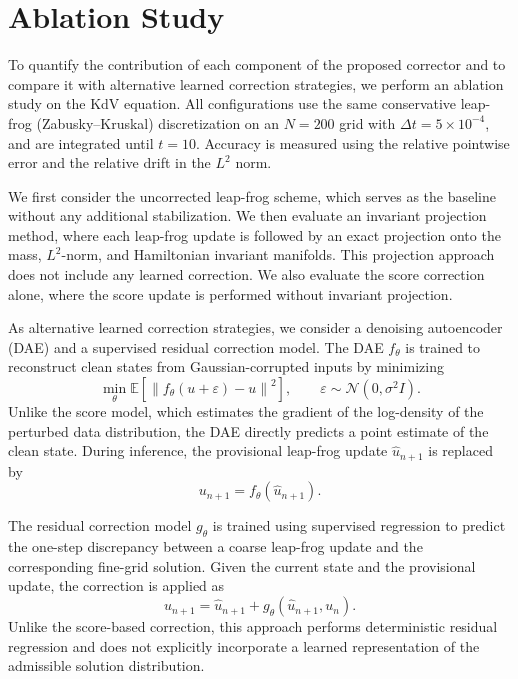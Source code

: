 \documentclass[letterpaper]{article} %
\begin{document}

\section{Ablation Study}
\label{app:ablation}

To quantify the contribution of each component of the proposed corrector and
to compare it with alternative learned correction strategies, we perform an
ablation study on the KdV equation. All configurations use the same
conservative leap-frog (Zabusky--Kruskal) discretization on an $N=200$ grid
with $\Delta t=5\times10^{-4}$, and are integrated until $t=10$. Accuracy is
measured using the relative pointwise error and the relative drift in the $L^2$ norm.

We first consider the uncorrected leap-frog scheme, which serves as the
baseline without any additional stabilization. We then evaluate an invariant
projection method, where each leap-frog update is followed by an exact
projection onto the mass, $L^2$-norm, and Hamiltonian invariant manifolds.
This projection approach does not include any learned correction. We also
evaluate the score correction alone, where the score update is performed
without invariant projection.

As alternative learned correction strategies, we consider a denoising
autoencoder (DAE) and a supervised residual correction model. The DAE
$f_\theta$ is trained to reconstruct clean states from Gaussian-corrupted
inputs by minimizing
\[
\min_\theta
\mathbb{E}\left[
\left\|f_\theta(u+\varepsilon)-u\right\|^2
\right],
\qquad
\varepsilon\sim\mathcal{N}(0,\sigma^2I).
\]
Unlike the score model, which estimates the gradient of the log-density of the
perturbed data distribution, the DAE directly predicts a point estimate of the
clean state. During inference, the provisional leap-frog update
$\hat u_{n+1}$ is replaced by
\[
u_{n+1}=f_\theta(\hat u_{n+1}).
\]

The residual correction model $g_\theta$ is trained using supervised
regression to predict the one-step discrepancy between a coarse leap-frog
update and the corresponding fine-grid solution. Given the current state and
the provisional update, the correction is applied as
\[
u_{n+1}
=
\hat u_{n+1}+g_\theta(\hat u_{n+1},u_n).
\]
Unlike the score-based correction, this approach performs deterministic
residual regression and does not explicitly incorporate a learned
representation of the admissible solution distribution.
\end{document}
